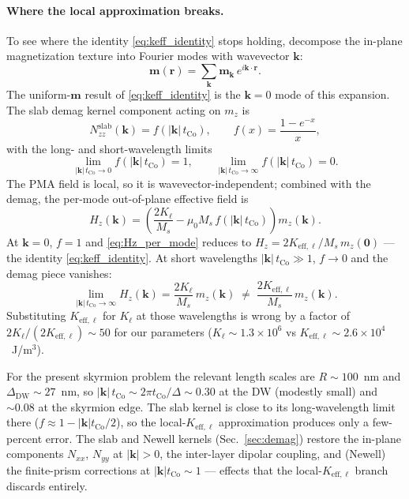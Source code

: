 \documentclass[11pt,a4paper]{article}
\newcommand{\mb}[1]{\mathbf{#1}}
\newcommand{\tCo}{t_{\text{Co}}}
\newcommand{\Ms}{M_s}
\begin{document}
\paragraph{Where the local approximation breaks.}
To see where the identity \eqref{eq:keff_identity} stops
holding, decompose the in-plane magnetization texture into
Fourier modes with wavevector $\mb{k}$:
%
\begin{equation}
\mb{m}(\mb{r}) =
    \sum_{\mb{k}} \mb{m}_{\mb{k}}\, e^{i\mb{k}\cdot\mb{r}}.
\end{equation}
%
The uniform-$\mb{m}$ result of \eqref{eq:keff_identity} is
the $\mb{k} = 0$ mode of this expansion.  The slab demag
kernel component acting on $m_z$ is
%
\begin{equation}
N_{zz}^{\text{slab}}(\mb{k}) = f(|\mb{k}|\,\tCo),
\qquad
f(x) = \frac{1 - e^{-x}}{x},
\label{eq:f_shape}
\end{equation}
%
with the long- and short-wavelength limits
%
\begin{equation}
\lim_{|\mb{k}|\,\tCo \to 0} f(|\mb{k}|\,\tCo) = 1,
\qquad
\lim_{|\mb{k}|\,\tCo \to \infty} f(|\mb{k}|\,\tCo) = 0.
\end{equation}
%
The PMA field is local, so it is wavevector-independent;
combined with the demag, the per-mode out-of-plane
effective field is
%
\begin{equation}
H_z(\mb{k}) =
\left(\frac{2K_\ell}{\Ms}
      - \mu_0 \Ms\, f(|\mb{k}|\,\tCo)\right) m_z(\mb{k}).
\label{eq:Hz_per_mode}
\end{equation}
%
At $\mb{k} = 0$, $f = 1$ and \eqref{eq:Hz_per_mode} reduces
to $H_z = 2K_{\text{eff},\ell}/\Ms\,m_z(\mb 0)$ --- the
identity \eqref{eq:keff_identity}.  At short wavelengths
$|\mb{k}|\,\tCo \gg 1$, $f \to 0$ and the demag piece
vanishes:
%
\begin{equation}
\lim_{|\mb{k}|\,\tCo \to \infty} H_z(\mb{k}) =
\frac{2K_\ell}{\Ms}\, m_z(\mb{k})
\;\neq\;
\frac{2K_{\text{eff},\ell}}{\Ms}\, m_z(\mb{k}).
\end{equation}
%
Substituting $K_{\text{eff},\ell}$ for $K_\ell$ at those
wavelengths is wrong by a factor of
$2K_\ell/(2K_{\text{eff},\ell}) \sim 50$ for our parameters
($K_\ell \sim 1.3\times 10^6$ vs
$K_{\text{eff},\ell} \sim 2.6\times 10^4$~J/m$^3$).

For the present skyrmion problem the relevant length scales
are $R \sim 100$~nm and $\Delta_{\text{DW}} \sim 27$~nm, so
$|\mb{k}|\,\tCo \sim 2\pi \tCo / \Delta \sim 0.30$ at the DW
(modestly small) and $\sim 0.08$ at the skyrmion edge.  The
slab kernel is close to its long-wavelength limit there
($f \approx 1 - |\mb{k}|\tCo/2$), so the
local-$K_{\text{eff},\ell}$ approximation produces only a
few-percent error.  The slab and Newell kernels
(Sec.~\ref{sec:demag}) restore the in-plane components
$N_{xx}$, $N_{yy}$ at $|\mb{k}| > 0$, the inter-layer dipolar
coupling, and (Newell) the finite-prism corrections at
$|\mb{k}|\tCo \sim 1$ --- effects that the
local-$K_{\text{eff},\ell}$ branch discards entirely.
\end{document}
